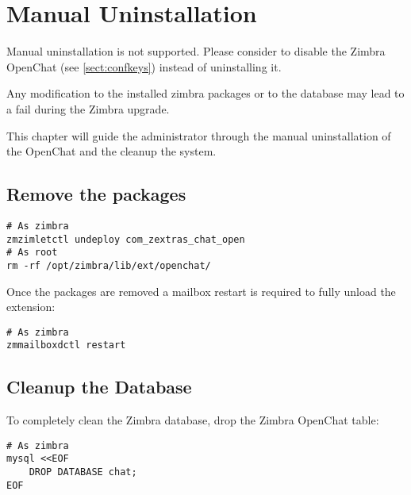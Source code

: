 \section{Manual Uninstallation}

\begin{warning}
    Manual uninstallation is not supported.
    Please consider to disable the Zimbra OpenChat (see \autoref{sect:confkeys}) instead of uninstalling it.

    Any modification to the installed zimbra packages or to the database may lead to a fail during the Zimbra upgrade.
\end{warning}

This chapter will guide the administrator through the manual uninstallation of the OpenChat and
the cleanup the system.

\subsection{Remove the packages}
    \begin{verbatim}
# As zimbra
zmzimletctl undeploy com_zextras_chat_open
# As root
rm -rf /opt/zimbra/lib/ext/openchat/
    \end{verbatim}

    Once the packages are removed a mailbox restart is required to fully unload the extension:
    \begin{verbatim}
# As zimbra
zmmailboxdctl restart
    \end{verbatim}

\subsection{Cleanup the Database}
    To completely clean the Zimbra database, drop the Zimbra OpenChat table:
    \begin{verbatim}
# As zimbra
mysql <<EOF
    DROP DATABASE chat;
EOF
    \end{verbatim}
